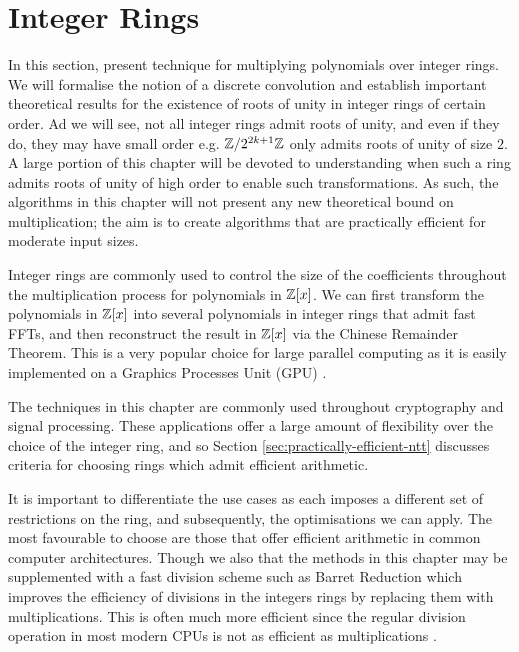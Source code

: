 \chapter{Integer Rings}\label{chp:integer-rings}

In this section, present technique for multiplying polynomials over integer rings. We will formalise the notion of a discrete convolution and establish important theoretical results for the existence of roots of unity in integer rings of certain order. Ad we will see, not all integer rings admit roots of unity, and even if they do, they may have small order e.g. ${\mathbb Z}/2^{2k + 1}{\mathbb Z}$ only admits roots of unity of size $2$. A large portion of this chapter will be devoted to understanding when such a ring admits roots of unity of high order to enable such transformations. As such, the algorithms in this chapter will not present any new theoretical bound on multiplication; the aim is to create algorithms that are practically efficient for moderate input sizes.


Integer rings are commonly used to control the size of the coefficients throughout the multiplication process for polynomials in ${\mathbb Z}[x]$. We can first transform the polynomials in ${\mathbb Z}[x]$ into several polynomials in integer rings that admit fast FFTs, and then reconstruct the result in ${\mathbb Z}[x]$ via the Chinese Remainder Theorem. This is a very popular choice for large parallel computing as it is easily implemented on a Graphics Processes Unit (GPU) \cite{gpu-mult} \cite{crt-parallel-mul} \cite{gpu-kepler-architecture}.

The techniques in this chapter are commonly used throughout cryptography and signal processing. These applications offer a large amount of flexibility over the choice of the integer ring, and so Section \ref{sec:practically-efficient-ntt} discusses criteria for choosing rings which admit efficient arithmetic.

It is important to differentiate the use cases as each imposes a different set of restrictions on the ring, and subsequently, the optimisations we can apply. The most favourable to choose are those that offer efficient arithmetic in common computer architectures. Though we also that the methods in this chapter may be supplemented with a fast division scheme such as Barret Reduction \cite{barret} which improves the efficiency of divisions in the integers rings by replacing them with multiplications. This is often much more efficient since the regular division operation in most modern CPUs is not as efficient as multiplications \cite{instruction-times}.

